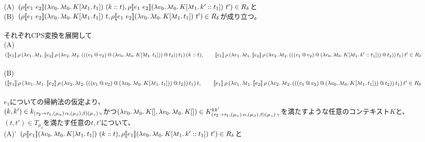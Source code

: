 \documentclass[japanese,draft]{jssst_ppl} %
\begin{document}
  (A)\ $(\rho \CPSTh{e_1\ e_2} \LamP{v_0}{\Lam{t_0}{K[\Lam{t_1}{t_1}]}}\ (\Cons{k}{t}), \rho \CPSTh{e_1\ e_2} \LamP{v_0}{\Lam{t_0}{K[\Lam{t_1}{\Cons{k'}{t_1}}]}}\ t')\in R_{\delta}$と\\
  (B)\ $(\rho [\![{e_1\ e_2}]\!] (\lambda{v_0}.\,{\lambda{t_0}.\,{K[\lambda{t_1}.\,{t_1}]}})\ t, \rho [\![{e_1\ e_2}]\!] (\lambda{v_0}.\,{\lambda{t_0}.\,{K[\lambda{t_1}.\,{t_1}]}})\ t')\in R_{\delta}$が成り立つ。\\
\\
それぞれCPS変換を展開して\\
  (A)\ $(\CPS{e_1}{\rho}
      {\LamP{v_1}{\Lam{t_1}{\CPS{e_2}{\rho}
            {\LamP{v_2}{\Lam{t_2}
                {\AppP{\AppP{\AppP{v_1}{v_2}}
                    {\LamP{v_0}{\Lam{t_0}
                        {K[\Lam{t_1}{t_1}]}}}}{t_2}}}}{t_1}}}}{(\Cons{k}{t})},\\
      \qquad \CPS{e_1}{\rho}
      {\LamP{v_1}{\Lam{t_1}{\CPS{e_2}{\rho}
            {\LamP{v_2}{\Lam{t_2}
                {\AppP{\AppP{\AppP{v_1}{v_2}}
                    {\LamP{v_0}{\Lam{t_0}
                        {K[\Lam{t_1}{\Cons{k'}{t_1}}]}}}}{t_2}}}}{t_1}}}}{t'}\in R_{\delta}$\\
 \\
  (B)\ $(\CPS{e_1}{\rho}
      {\LamP{v_1}{\Lam{t_1}{\CPS{e_2}{\rho}
            {\LamP{v_2}{\Lam{t_2}
                {\AppP{\AppP{\AppP{v_1}{v_2}}
                    {\LamP{v_0}{\Lam{t_0}
                        {K[\Lam{t_1}{t_1}]}}}}{t_2}}}}{t_1}}}}{t},\\
      \qquad \CPS{e_1}{\rho}
      {\LamP{v_1}{\Lam{t_1}{\CPS{e_2}{\rho}
            {\LamP{v_2}{\Lam{t_2}
                {\AppP{\AppP{\AppP{v_1}{v_2}}
                    {\LamP{v_0}{\Lam{t_0}
                        {K[\Lam{t_1}{t_1}]}}}}{t_2}}}}{t_1}}}}{t'}\in R_{\delta}$\\
      \\
$e_1$についての帰納法の仮定より、\\
$(k,k')\in k_{(\tau_2\rightarrow{\tau_1},(\mu_{\alpha})\,\alpha,(\mu_{\beta})\,\beta) (\mu_{\gamma})\,\gamma}$かつ$(\lambda{v_0}.\,{\lambda{t_0}.\,{K[]}}, \lambda{v_0}.\,{\lambda{t_0}.\,{K[]}})\in  K^{kk'}_{(\tau_2\rightarrow{\tau_1},(\mu_{\alpha})\,\alpha,(\mu_{\beta})\,\beta) (\mu_{\gamma})\,\gamma}$を満たすような任意のコンテキスト$K$と、$(t, t') \in T_{\mu_{\delta}}$を満たす任意の$t, t'$について、\\
  (A)'\ $(\rho [\![{e_1}]\!] (\lambda{v_0}.\,{\lambda{t_0}.\,{K[\lambda{t_1}.\,{t_1}]}})\ (k::t), \rho [\![{e_1}]\!] (\lambda{v_0}.\,{\lambda{t_0}.\,{K[\lambda{t_1}.\,{k'::t_1}]}})\ t')\in R_{\delta}$と\\
\end{document}
